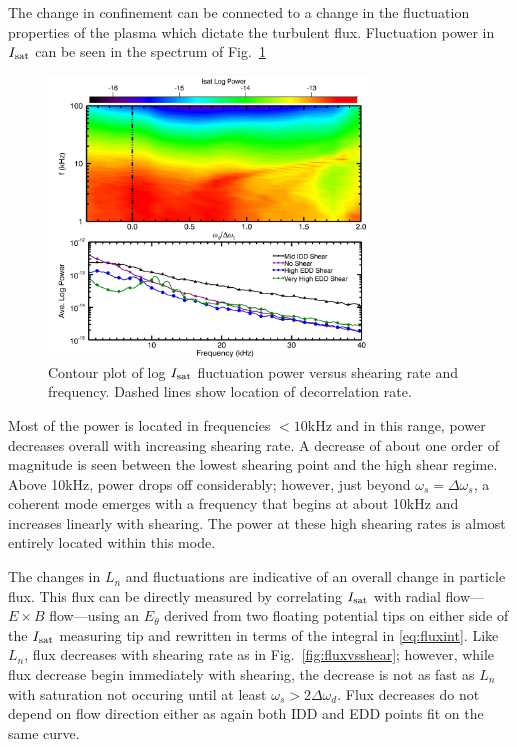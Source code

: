 \documentclass[aps,prl,amsmath,amssymb,preprint,superscriptaddress]{revtex4}
\begin{document}
The change in confinement can be connected to a change in the fluctuation properties of the plasma which dictate the turbulent flux. Fluctuation power in $I_{\rm sat}$ can be seen in the spectrum of Fig.~\ref{fig:powercontour}
\begin{figure}
\begin{center}
\includegraphics[width=8.5cm]{powercontour.pdf}%
\caption{\label{fig:powercontour} Contour plot of log $I_{\rm sat}$ fluctuation power versus shearing rate and frequency. Dashed lines show location of decorrelation rate.}
\end{center}
\end{figure}
Most of the power is located in frequencies $<10$kHz and in this range, power decreases overall with increasing shearing rate. A decrease of about one order of magnitude is seen between the lowest shearing point and the high shear regime. Above 10kHz, power drops off considerably; however, just beyond $\omega_{s} = \Delta \omega_{s}$, a coherent mode emerges with a frequency that begins at about 10kHz and increases linearly with shearing. The power at these high shearing rates is almost entirely located within this mode.

The changes in $L_{n}$ and fluctuations are indicative of an overall change in particle flux. This flux can be directly measured by correlating $I_{\rm sat}$ with radial flow---$E \times B$ flow---using an $E_{\theta}$ derived from two floating potential tips on either side of the $I_{\rm sat}$ measuring tip and rewritten in terms of the integral in \eqref{eq:fluxint}. Like $L_{n}$, flux decreases with shearing rate as in Fig.~\ref{fig:fluxvsshear}; however, while flux decrease begin immediately with shearing, the decrease is not as fast as $L_{n}$ with saturation not occuring until at least $\omega_{s} > 2\Delta \omega_{d}$. Flux decreases do not depend on flow direction either as again both IDD and EDD points fit on the same curve.
\end{document}
